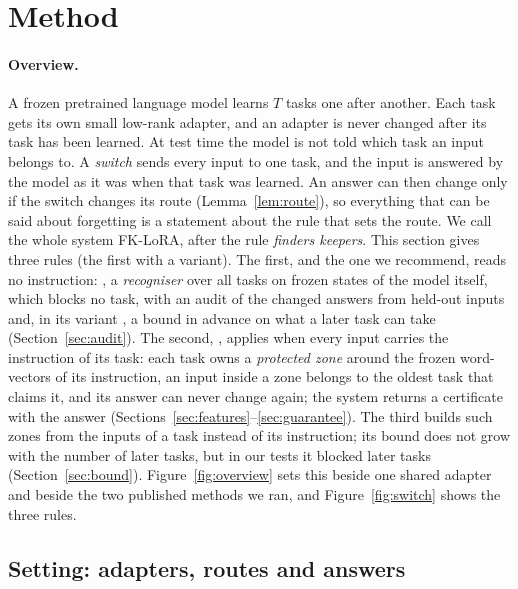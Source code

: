 \section{Method}
\label{sec:method}

\paragraph{Overview.} A frozen pretrained language model learns $T$ tasks one after another. Each
task gets its own small low-rank adapter, and an adapter is never changed after its task has been
learned. At test time the model is not told which task an input belongs to. A \emph{switch} sends
every input to one task, and the input is answered by the model as it was when that task was
learned. An answer can then change only if the switch changes its route (Lemma~\ref{lem:route}),
so everything that can be said about forgetting is a statement about the rule that sets the route.
We call the whole system FK-LoRA, after the rule \emph{finders keepers}.
This section gives three rules (the first with a variant). The first, and the one we recommend, reads no instruction: \recog{}, a
\emph{recogniser} over all tasks on frozen states of the model itself, which blocks no task, with
an audit of the changed answers from held-out inputs and, in its variant \handicap{}, a bound in advance on what a later task
can take (Section~\ref{sec:audit}). The second, \cert{}, applies when every input carries the instruction of
its task: each task owns a \emph{protected zone} around the frozen word-vectors of its instruction,
an input inside a zone belongs to the oldest task that claims it, and its answer can never change
again; the system returns a certificate with the answer
(Sections~\ref{sec:features}--\ref{sec:guarantee}). The third builds such zones from the inputs of a
task instead of its instruction; its bound does not grow with the number of later tasks, but in our
tests it blocked later tasks (Section~\ref{sec:bound}). Figure~\ref{fig:overview} sets this beside one shared adapter and beside the two published methods we ran, and Figure~\ref{fig:switch} shows the three rules.



\subsection{Setting: adapters, routes and answers}
\label{sec:setting}

